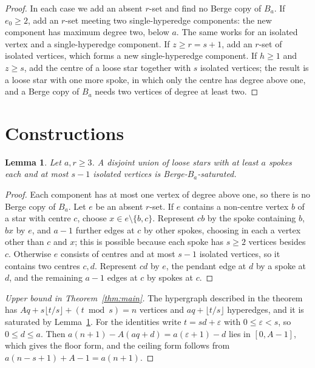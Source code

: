 \documentclass[11pt]{article}
\newtheorem{lemma}[theorem]{Lemma}
\theoremstyle{definition}
\theoremstyle{remark}
\begin{document}
\begin{proof}
In each case we add an absent $r$-set and find no Berge copy of $B_a$. If
$e_0\ge2$, add an $r$-set meeting two single-hyperedge components: the new
component has maximum degree two, below $a$. The same works for an
isolated vertex and a single-hyperedge component. If $z\ge r=s+1$, add an
$r$-set of isolated vertices, which forms a new single-hyperedge component.
If $h\ge1$ and $z\ge s$, add the centre of a loose star together with $s$
isolated vertices; the result is a loose star with one more spoke, in which
only the centre has degree above one, and a Berge copy of $B_a$ needs two
vertices of degree at least two.
\end{proof}

\section{Constructions}

\begin{lemma}\label{lem:stars}
Let $a,r\ge3$. A disjoint union of loose stars with at least $a$ spokes
each and at most $s-1$ isolated vertices is Berge-$B_a$-saturated.
\end{lemma}

\begin{proof}
Each component has at most one vertex of degree above one, so there is no
Berge copy of $B_a$. Let $e$ be an absent $r$-set. If $e$ contains a
non-centre vertex $b$ of a star with centre $c$, choose $x\in
e\setminus\{b,c\}$. Represent $cb$ by the spoke containing $b$, $bx$ by
$e$, and $a-1$ further edges at $c$ by other spokes, choosing in each a
vertex other than $c$ and $x$; this is possible because each spoke has
$s\ge2$ vertices besides $c$. Otherwise $e$ consists of centres and at most
$s-1$ isolated vertices, so it contains two centres $c,d$. Represent $cd$
by $e$, the pendant edge at $d$ by a spoke at $d$, and the remaining $a-1$
edges at $c$ by spokes at $c$.
\end{proof}

\begin{proof}[Upper bound in Theorem~\ref{thm:main}]
The hypergraph described in the theorem has $Aq+s\lfloor t/s\rfloor+(t\bmod
s)=n$ vertices and $aq+\lfloor t/s\rfloor$ hyperedges, and it is saturated
by Lemma~\ref{lem:stars}. For the identities write $t=sd+\varepsilon$ with
$0\le\varepsilon<s$, so $0\le d\le a$. Then $a(n+1)-A(aq+d)=a(\varepsilon+1)
-d$ lies in $[0,A-1]$, which gives the floor form, and the ceiling form
follows from $a(n-s+1)+A-1=a(n+1)$.
\end{proof}
\end{document}
